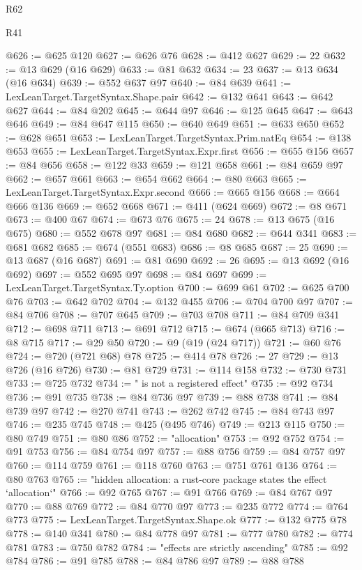 \begin{lexlean}{R62}
\begin{lexlean}{R41}
\begin{coremodule}
{{{{{{{{{{{{{{{{{{{{{{{{{{{{{{{{{{{{{{{{{{{{{{{{{{{{{{{{{{{{{{{{{{{{{{{{{{{{{{{{{{{{{{{@626 := @625 @120
@627 := @626 @76
@628 := @412 @627
@629 := 22
@632 := @13 @629 (@16 @629)
@633 := @81 @632
@634 := 23
@637 := @13 @634 (@16 @634)
@639 := @552 @637 @97
@640 := @84 @639
@641 := LexLeanTarget.TargetSyntax.Shape.pair
@642 := @132 @641
@643 := @642 @627
@644 := @84 @202
@645 := @644 @97
@646 := @125 @645
@647 := @643 @646
@649 := @84 @647 @115
@650 := @640 @649
@651 := @633 @650
@652 := @628 @651
@653 := LexLeanTarget.TargetSyntax.Prim.natEq
@654 := @138 @653
@655 := LexLeanTarget.TargetSyntax.Expr.first
@656 := @655 @156
@657 := @84 @656
@658 := @122 @33
@659 := @121 @658
@661 := @84 @659 @97
@662 := @657 @661
@663 := @654 @662
@664 := @80 @663
@665 := LexLeanTarget.TargetSyntax.Expr.second
@666 := @665 @156
@668 := @664 @666 @136
@669 := @652 @668
@671 := @411 (@624 @669)
@672 := @8 @671
@673 := @400 @67
@674 := @673 @76
@675 := 24
@678 := @13 @675 (@16 @675)
@680 := @552 @678 @97
@681 := @84 @680
@682 := @644 @341
@683 := @681 @682
@685 := @674 (@551 @683)
@686 := @8 @685
@687 := 25
@690 := @13 @687 (@16 @687)
@691 := @81 @690
@692 := 26
@695 := @13 @692 (@16 @692)
@697 := @552 @695 @97
@698 := @84 @697
@699 := LexLeanTarget.TargetSyntax.Ty.option
@700 := @699 @61
@702 := @625 @700 @76
@703 := @642 @702
@704 := @132 @455
@706 := @704 @700 @97
@707 := @84 @706
@708 := @707 @645
@709 := @703 @708
@711 := @84 @709 @341
@712 := @698 @711
@713 := @691 @712
@715 := @674 (@665 @713)
@716 := @8 @715
@717 := @29 @50
@720 := @9 (@19 (@24 @717))
@721 := @60 @76
@724 := @720 (@721 @68) @78
@725 := @414 @78
@726 := 27
@729 := @13 @726 (@16 @726)
@730 := @81 @729
@731 := @114 @158
@732 := @730 @731
@733 := @725 @732
@734 := " is not a registered effect"
@735 := @92 @734
@736 := @91 @735
@738 := @84 @736 @97
@739 := @88 @738
@741 := @84 @739 @97
@742 := @270 @741
@743 := @262 @742
@745 := @84 @743 @97
@746 := @235 @745
@748 := @425 (@495 @746)
@749 := @213 @115
@750 := @80 @749
@751 := @80 @86
@752 := "allocation"
@753 := @92 @752
@754 := @91 @753
@756 := @84 @754 @97
@757 := @88 @756
@759 := @84 @757 @97
@760 := @114 @759
@761 := @118 @760
@763 := @751 @761 @136
@764 := @80 @763
@765 := "hidden allocation: a rust-core package states the effect `allocation`"
@766 := @92 @765
@767 := @91 @766
@769 := @84 @767 @97
@770 := @88 @769
@772 := @84 @770 @97
@773 := @235 @772
@774 := @764 @773
@775 := LexLeanTarget.TargetSyntax.Shape.ok
@777 := @132 @775 @78
@778 := @140 @341
@780 := @84 @778 @97
@781 := @777 @780
@782 := @774 @781
@783 := @750 @782
@784 := "effects are strictly ascending"
@785 := @92 @784
@786 := @91 @785
@788 := @84 @786 @97
@789 := @88 @788
}}}}}}}}}}}}}}}}}}}}}}}}}}}}}}}}}}}}}}}}}}}}}}}}}}}}}}}}}}}}}}}}}}}}}}}}}}}}}}}}}}}}}}}
\end{coremodule}
\end{lexlean}
\end{lexlean}
